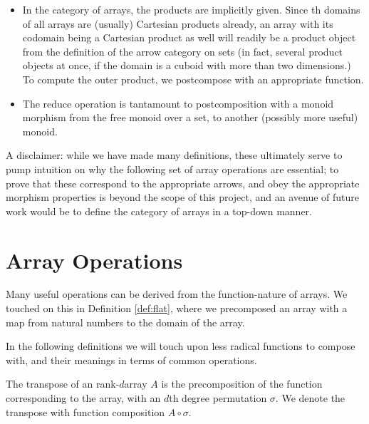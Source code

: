 \documentclass{DIKU-report-variant}
\begin{document}
\begin{observation}
  \label{ob:category-of-arrays}

  \begin{itemize}
    \item In the category of arrays, the products are implicitly given. Since th domains
      of all arrays are (usually) Cartesian products already, an array with its codomain being
      a Cartesian product as well will readily be a product object from the definition of
      the arrow category on sets (in fact, several product objects
      at once, if the domain is a cuboid with more than two dimensions.) To compute the outer
      product, we postcompose with an appropriate function.

    \item The reduce operation is tantamount to postcomposition with a
      monoid morphism from the free monoid over a set, to another (possibly more useful) monoid.
  \end{itemize}
\end{observation}

A disclaimer: while we have made many definitions, these ultimately
serve to pump intuition on why the following set of array operations
are essential; to prove that these correspond to the appropriate arrows,
and obey the appropriate morphism properties is beyond the scope of this
project, and an avenue of future work would be to define the category of
arrays in a top-down manner.

\section{Array Operations}
\label{sec:array-operations}

\begin{remark}
  \label{rem:functions}
  Many useful operations can be derived from the function-nature of arrays. We touched
  on this in Definition \ref{def:flat}, where we precomposed an array with a map
  from natural numbers to the domain of the array.

  In the following definitions we will touch upon less radical functions
  to compose with, and their meanings in terms of common operations.
\end{remark}

\begin{definition}
  \label{def:transpose}
  The transpose of an rank-\(d\)array \(A\) is the precomposition
  of the function corresponding to the array, with an \(d\)th degree permutation \(\sigma\).
  We denote the transpose with function composition \(A \circ \sigma\).
\end{definition}
\end{document}
